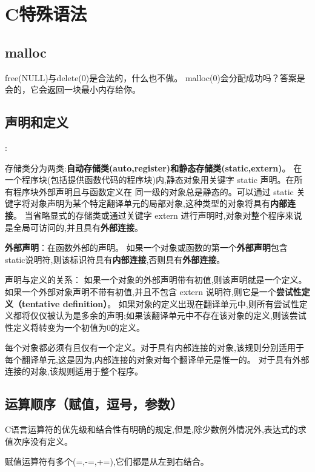 

\section{C特殊语法}

\subsection{malloc}
free(NULL)与delete(0)是合法的，什么也不做。
malloc(0)会分配成功吗？答案是会的，它会返回一块最小内存给你。

\subsection{声明和定义}


\cite{krc}:

存储类分为两类:\textbf{自动存储类(auto,register)和静态存储类(static,extern)}。
在一个程序块(包括提供函数代码的程序块)内,静态对象用关键字 static 声明。在所有程序块外部声明且与函数定义在
同一级的对象总是静态的。可以通过 static 关键字将对象声明为某个特定翻译单元的局部对象,这种类型的对象将具有\textbf{内部连接}。
当省略显式的存储类或通过关键字 extern 进行声明时,对象对整个程序来说是全局可访问的,并且具有\textbf{外部连接}。

\textbf{外部声明}：在函数外部的声明。
如果一个对象或函数的第一个\textbf{外部声明}包含 static说明符,则该标识符具有\textbf{内部连接},否则具有\textbf{外部连接}。

声明与定义的关系：
如果一个对象的外部声明带有初值,则该声明就是一个定义。
如果一个外部对象声明不带有初值,并且不包含 extern 说明符,则它是一个\textbf{尝试性定义（tentative definition）}。
如果对象的定义出现在翻译单元中,则所有尝试性定义都将仅仪被认为是多余的声明;如果该翻译单元中不存在该对象的定义,则该尝试性定义将转变为一个初值为0的定义。

每个对象都必须有且仅有一个定义。对于具有内部连接的对象,该规则分别适用于每个翻译单元,这是因为,内部连接的对象对每个翻译单元是惟一的。
对于具有外部连接的对象,该规则适用于整个程序。


\subsection{运算顺序（赋值，逗号，参数）}
C语言运算符的优先级和结合性有明确的规定,但是,除少数例外情况外,表达式的求值次序没有定义。

赋值运算符有多个(=,-=,+=),它们都是从左到右结合。

